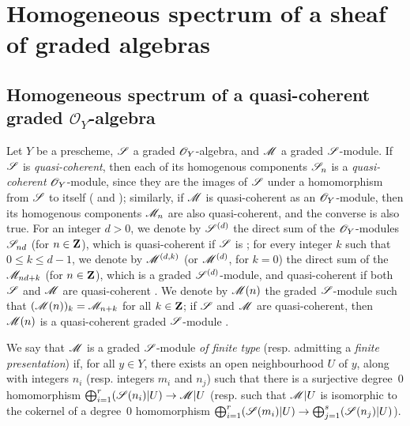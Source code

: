 \section{Homogeneous spectrum of a sheaf of graded algebras}
\label{section:II.3}


\subsection{Homogeneous spectrum of a quasi-coherent graded $\mathcal{O}_Y$-algebra}
\label{subsection:II.3.1}

\begin{env}[3.1.1]
\label{II.3.1.1}
Let $Y$ be a prescheme, $\mathscr{S}$ a graded $\mathscr{O}_Y$-algebra, and $\mathscr{M}$ a graded $\mathscr{S}$-module.
If $\mathscr{S}$ is \emph{quasi-coherent}, then each of its homogenous components $\mathscr{S}_n$ is a \emph{quasi-coherent} $\mathscr{O}_Y$-module, since they are the images of $\mathscr{S}$ under a homomorphism from $\mathscr{S}$ to itself ( and );
similarly, if $\mathscr{M}$ is quasi-coherent as an $\mathscr{O}_Y$-module, then its homogenous components $\mathscr{M}_n$ are also quasi-coherent, and the converse is also true.
For an integer $d>0$, we denote by $\mathscr{S}^{(d)}$ the direct sum of the $\mathscr{O}_Y$-modules $\mathscr{S}_{nd}$ (for $n\in\mathbf{Z}$), which is quasi-coherent if $\mathscr{S}$ is ;
for every integer $k$ such that $0\leq k\leq d-1$, we denote by $\mathscr{M}^{(d,k)}$ (or $\mathscr{M}^{(d)}$, for $k=0$) the direct sum of the $\mathscr{M}_{nd+k}$ (for $n\in\mathbf{Z}$), which is a graded $\mathscr{S}^{(d)}$-module, and quasi-coherent if both $\mathscr{S}$ and $\mathscr{M}$ are quasi-coherent .
We denote by $\mathscr{M}(n)$ the graded $\mathscr{S}$-module such that $(\mathscr{M}(n))_k=\mathscr{M}_{n+k}$ for all $k\in\mathbf{Z}$;
if $\mathscr{S}$ and $\mathscr{M}$ are quasi-coherent, then $\mathscr{M}(n)$ is a quasi-coherent graded $\mathscr{S}$-module .

We say that $\mathscr{M}$ is a graded $\mathscr{S}$-module \emph{of finite type} (resp. admitting a \emph{finite presentation})  if, for all $y\in Y$, there exists an open neighbourhood $U$ of $y$, along with integers $n_i$ (resp. integers $m_i$ and $n_j$) such that there is a surjective degree~$0$ homomorphism $\bigoplus_{i=1}^r(\sh{S}(n_i)|U)\to\sh{M}|U$ (resp. such that $\mathscr{M}|U$ is isomorphic to the cokernel of a degree~$0$ homomorphism $\bigoplus_{i=1}^r(\sh{S}(m_i)|U)\to\bigoplus_{j=1}^s(\sh{S}(n_j)|U)$).


\end{env}
